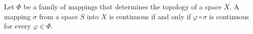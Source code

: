 Let $\Phi$ be a family of mappings that determines the topology of a space $X$. A mapping $\sigma$ from a space $S$ into $X$ is continuous if and only if $\varphi \circ \sigma$ is continuous for every $\varphi \in \Phi$.
